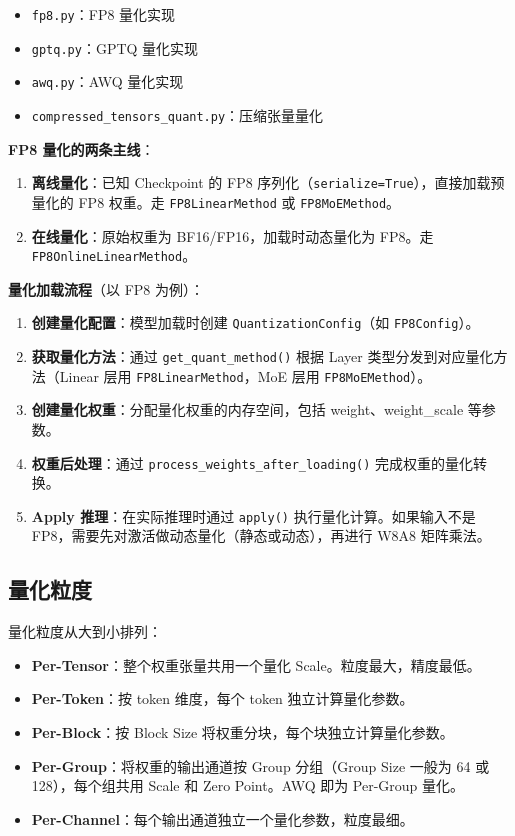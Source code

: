 \documentclass[a4paper]{article}
\begin{document}
\begin{itemize}
    \item \texttt{fp8.py}：FP8 量化实现
    \item \texttt{gptq.py}：GPTQ 量化实现
    \item \texttt{awq.py}：AWQ 量化实现
    \item \texttt{compressed\_tensors\_quant.py}：压缩张量量化
\end{itemize}

\textbf{FP8 量化的两条主线}：

\begin{enumerate}
    \item \textbf{离线量化}：已知 Checkpoint 的 FP8 序列化（\texttt{serialize=True}），直接加载预量化的 FP8 权重。走 \texttt{FP8LinearMethod} 或 \texttt{FP8MoEMethod}。
    \item \textbf{在线量化}：原始权重为 BF16/FP16，加载时动态量化为 FP8。走 \texttt{FP8OnlineLinearMethod}。
\end{enumerate}

\textbf{量化加载流程}（以 FP8 为例）：

\begin{enumerate}
    \item \textbf{创建量化配置}：模型加载时创建 \texttt{QuantizationConfig}（如 \texttt{FP8Config}）。
    \item \textbf{获取量化方法}：通过 \texttt{get\_quant\_method()} 根据 Layer 类型分发到对应量化方法（Linear 层用 \texttt{FP8LinearMethod}，MoE 层用 \texttt{FP8MoEMethod}）。
    \item \textbf{创建量化权重}：分配量化权重的内存空间，包括 weight、weight\_scale 等参数。
    \item \textbf{权重后处理}：通过 \texttt{process\_weights\_after\_loading()} 完成权重的量化转换。
    \item \textbf{Apply 推理}：在实际推理时通过 \texttt{apply()} 执行量化计算。如果输入不是 FP8，需要先对激活做动态量化（静态或动态），再进行 W8A8 矩阵乘法。
\end{enumerate}

\subsection{量化粒度}

量化粒度从大到小排列：

\begin{itemize}
    \item \textbf{Per-Tensor}：整个权重张量共用一个量化 Scale。粒度最大，精度最低。
    \item \textbf{Per-Token}：按 token 维度，每个 token 独立计算量化参数。
    \item \textbf{Per-Block}：按 Block Size 将权重分块，每个块独立计算量化参数。
    \item \textbf{Per-Group}：将权重的输出通道按 Group 分组（Group Size 一般为 64 或 128），每个组共用 Scale 和 Zero Point。AWQ 即为 Per-Group 量化。
    \item \textbf{Per-Channel}：每个输出通道独立一个量化参数，粒度最细。
\end{itemize}
\end{document}
